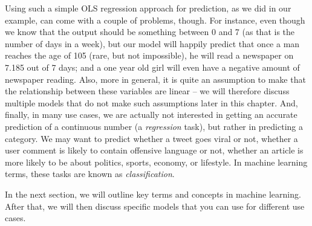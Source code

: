 Using such a simple OLS regression approach for prediction, as we did in our
example, can come with a couple of problems, though.
For instance, even though we know that the output should be something between
0 and 7 (as that is the number of days in a week), but our model will happily
predict that once a man reaches the age of 105 (rare, but not impossible), he
will read a newspaper on 7.185 out of 7 days; and a one year old girl will
even have a negative amount of newspaper reading.
Also, more in general, it is quite an assumption to make that the relationship between these variables are linear -- we will therefore discuss multiple models that do not make such assumptions later in this chapter.
And, finally, in many use cases, we are actually not interested in getting
an accurate prediction of a continuous number (a \textit{regression} task), but rather in predicting a category. We may want to predict whether a tweet goes viral or not, whether a user comment is likely to contain offensive language or not, whether an article is more likely to be about politics, sports, economy, or lifestyle. In machine learning terms, these tasks are known as \textit{classification}.

In the next section, we will outline key terms and concepts in machine
learning. After that, we will then discuss specific models that you
can use for different use cases.